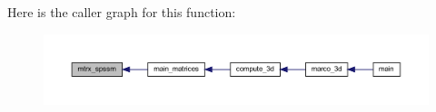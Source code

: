 Here is the caller graph for this function\+:
\nopagebreak
\begin{figure}[H]
\begin{center}
\leavevmode
\includegraphics[width=350pt]{Marco_8f90_afcb6780579e2ba238d661f0c3425dde9_icgraph}
\end{center}
\end{figure}
\mbox{\label{Marco_8f90_ac9d0c58e3d3c8bd0e73c6eb53c79f71c}} 
